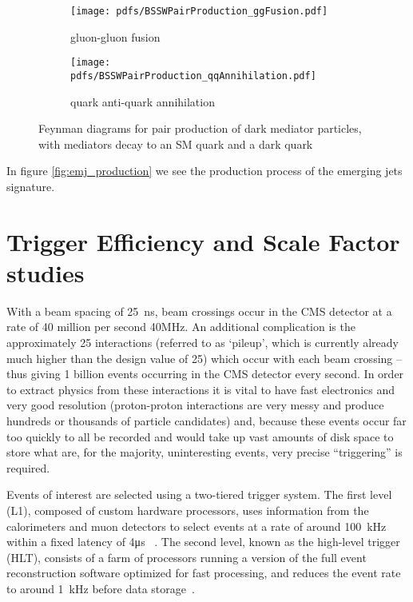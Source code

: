 \begin{figure}
	\begin{center}
		\begin{subfigure}{.45\linewidth}
			\texttt{[image: pdfs/BSSWPairProduction\_ggFusion.pdf]}
			\caption{gluon-gluon fusion}
		\end{subfigure}
		\begin{subfigure}{.45\linewidth}
			\texttt{[image: pdfs/BSSWPairProduction\_qqAnnihilation.pdf]}
			\caption{quark anti-quark annihilation}
		\end{subfigure}
	\end{center}
	\caption[Emergin jets production modes]{Feynman diagrams for pair production of dark mediator particles, with mediators decay to an SM quark and a dark quark}
\end{figure}

In figure \ref{fig:emj_production} we see the production process of the emerging jets signature.

\clearpage

\section{Trigger Efficiency and Scale Factor studies}


With a beam spacing of 25~ns, beam crossings occur in the CMS detector at a rate of 40 million per second 40\unit{\MHz}.
An additional complication is the approximately 25 interactions (referred to as `pileup', which is currently already much higher than the design value of 25) which occur with each beam crossing -- thus giving 1 billion events occurring in the CMS detector every second. In order to extract physics from these interactions it is vital to have fast electronics and very good resolution (proton-proton interactions are very messy and produce hundreds or thousands of particle candidates) and, because these events occur far too quickly to all be recorded and would take up vast amounts of disk space to store what are, for the majority, uninteresting events, very precise ``triggering'' is required.

Events of interest are selected using a two-tiered trigger system. The first level (L1), composed of custom hardware processors, uses information from the calorimeters and muon detectors to select events at a rate of around 100~\unit{kHz} within a fixed latency of 4\unit{\us} ~\cite{CMS:2020cmk}. The second level, known as the high-level trigger (HLT), consists of a farm of processors running a version of the full event reconstruction software optimized for fast processing, and reduces the event rate to around 1~\unit{kHz} before data storage~\cite{CMS:2016ngn}.


